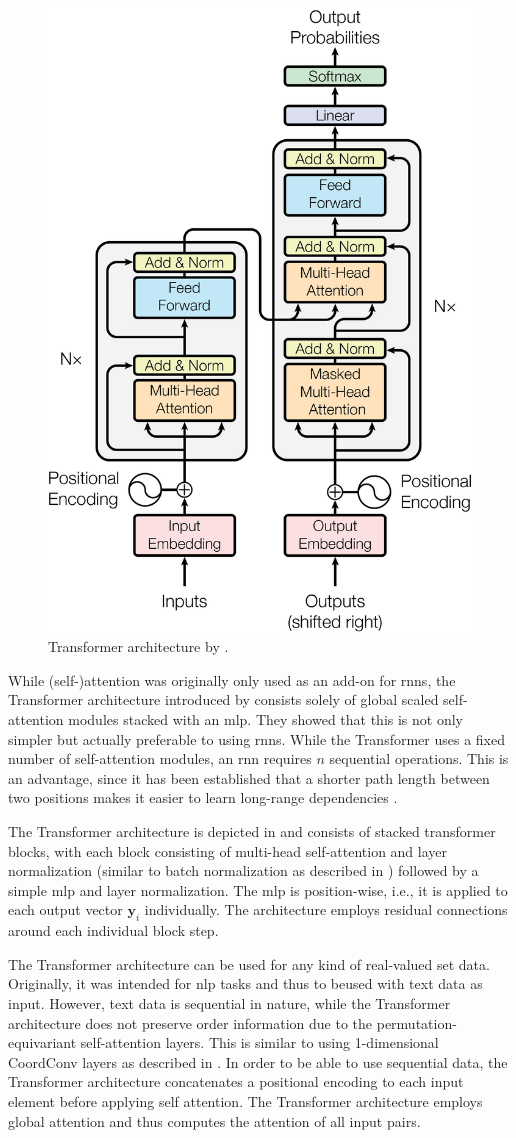 \begin{figure}[h]
        \centering
        \includegraphics[width=.3\textwidth]{graphics/ModalNet-21}
        \caption{Transformer architecture by \citet{DBLP:conf/nips/VaswaniSPUJGKP17}.}
        \label{fig:transformer}
\end{figure}

While (self-)attention was originally only used as an add-on for \glspl{rnn}, the Transformer architecture introduced by \citet{DBLP:conf/nips/VaswaniSPUJGKP17} consists solely of global scaled self-attention modules stacked with an \gls{mlp}. They showed that this is not only simpler but actually preferable to using \glspl{rnn}. While the Transformer uses a fixed number of self-attention modules, an \gls{rnn} requires $n$ sequential operations. This is an advantage, since it has been established that a shorter path length between two positions makes it easier to learn long-range dependencies \citep{5264952}.

The Transformer architecture is depicted in  and consists of stacked transformer blocks, with each block consisting of multi-head self-attention and layer normalization \citep{DBLP:journals/corr/BaKH16} (similar to batch normalization as described in ) followed by a simple \gls{mlp} and layer normalization. The \gls{mlp} is position-wise, i.e., it is applied to each output vector $\mathbf{y}_i$ individually. The architecture employs residual connections \citep{7780459} around each individual block step.

The Transformer architecture can be used for any kind of real-valued set data. Originally, it was intended for \gls{nlp} tasks and thus to beused with text data as input. However, text data is sequential in nature, while the Transformer architecture does not preserve order information due to the permutation-equivariant self-attention layers. This is similar to using 1-dimensional CoordConv layers as described in . In order to be able to use sequential data, the Transformer architecture concatenates a positional encoding to each input element before applying self attention. The Transformer architecture employs global attention and thus computes the attention of all input pairs.


